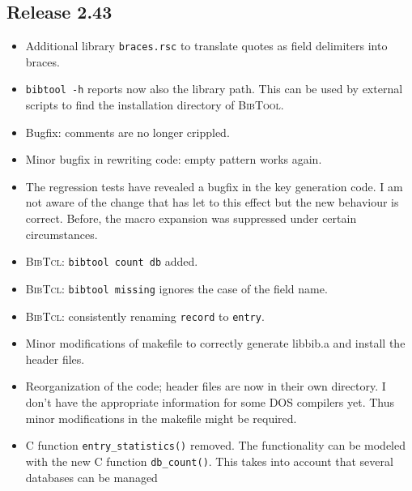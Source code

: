 \documentclass[11pt,a4paper]{scrartcl}
\newcommand\rsc[1]{\texttt{#1}}
\newcommand\File[1]{\textsf{#1}}
\newcommand\BibTool{\textsc{BibTool}}
\newcommand\BibTcl{\textsc{BibTcl}}
\newenvironment{Release}[2]{%
  \def\tmp{#2}%
  \section*{Release #1 \ifx\tmp\empty\else{\normalsize[#2]}\fi}
  \begin{itemize}
}{\end{itemize}}
\newenvironment{Fix}[1]{\item }{}
\newenvironment{New}[1]{\item }{}
\newenvironment{Update}[1]{\item }{}
\begin{document}
\begin{multicols}
 \begin{Release}{2.43}{}
  \begin{New}{gene}
    Additional library \rsc{braces.rsc} to translate quotes as field
    delimiters into braces.
  \end{New}
  \begin{Update}{gene}
    \verb|bibtool -h| reports now also the library path. This can be
    used by external scripts to find the installation directory of
    \BibTool.
  \end{Update}
  \begin{Fix}{gene}
    Bugfix: comments are no longer crippled.
  \end{Fix}
  \begin{Fix}{gene}
    Minor bugfix in rewriting code: empty pattern works again.
  \end{Fix}
  \begin{Fix}{gene}
    The regression tests have revealed a bugfix in the key generation
    code. I am not aware of the change that has let to this effect but
    the new behaviour is correct. Before, the macro expansion was
    suppressed under certain circumstances.
  \end{Fix}
  \begin{New}{gene}
    \BibTcl: \verb|bibtool count db| added.
  \end{New}
  \begin{Fix}{gene}
    \BibTcl: \verb|bibtool missing| ignores the case of the field
    name.
  \end{Fix}
  \begin{Update}{gene}
    \BibTcl: consistently renaming \verb|record| to \verb|entry|.
  \end{Update}
  \begin{Fix}{gene}
    Minor modifications of makefile to correctly generate
    \File{libbib.a} and install the header files.
  \end{Fix}
  \begin{Update}{gene}
    Reorganization of the code; header files are now in their own directory. I
    don't have the appropriate information for some DOS compilers yet.
    Thus minor modifications in the makefile might be required.
  \end{Update}
  \begin{New}{gene}
    C function \verb|entry_statistics()| removed. The functionality
    can be modeled with the new C function \verb|db_count()|. This
    takes into account that several databases can be managed

\end{New}
\end{Release}
\end{multicols}
\end{document}
